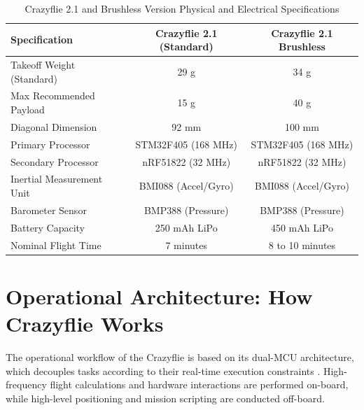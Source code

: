 \begin{table}[h!]
\centering
\caption{Crazyflie 2.1 and Brushless Version Physical and Electrical Specifications}
\label{tab:cf_specs_detailed}
\begin{tabular}{|l|c|c|}
\hline
\textbf{Specification} & \textbf{Crazyflie 2.1 (Standard)} & \textbf{Crazyflie 2.1 Brushless} \\
\hline
Takeoff Weight (Standard) & 29 g & 34 g \\
Max Recommended Payload & 15 g & 40 g \\
Diagonal Dimension & 92 mm & 100 mm \\
Primary Processor & STM32F405 (168 MHz) & STM32F405 (168 MHz) \\
Secondary Processor & nRF51822 (32 MHz) & nRF51822 (32 MHz) \\
Inertial Measurement Unit & BMI088 (Accel/Gyro) & BMI088 (Accel/Gyro) \\
Barometer Sensor & BMP388 (Pressure) & BMP388 (Pressure) \\
Battery Capacity & 250 mAh LiPo & 450 mAh LiPo \\
Nominal Flight Time & 7 minutes & 8 to 10 minutes \\
\hline
\end{tabular}
\end{table}

\section{Operational Architecture: How Crazyflie Works}
The operational workflow of the Crazyflie is based on its dual-MCU architecture, which decouples tasks according to their real-time execution constraints \cite{ref_40}. High-frequency flight calculations and hardware interactions are performed on-board, while high-level positioning and mission scripting are conducted off-board.

